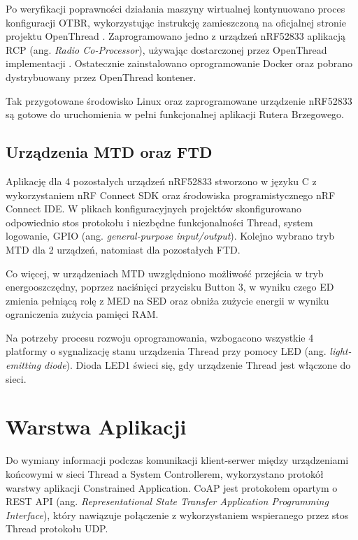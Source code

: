         Po weryfikacji poprawności działania maszyny wirtualnej kontynuowano proces konfiguracji OTBR, wykorzystując instrukcję zamieszczoną na oficjalnej stronie projektu OpenThread \cite{otbr-docker}. Zaprogramowano jedno z urządzeń nRF52833 aplikacją RCP (ang. \textit{Radio Co-Processor}), używając dostarczonej przez OpenThread implementacji \cite{otbr-rcp-app}. Ostatecznie zainstalowano oprogramowanie Docker oraz pobrano dystrybuowany przez OpenThread kontener.

        Tak przygotowane środowisko Linux oraz zaprogramowane urządzenie nRF52833 są gotowe do uruchomienia w pełni funkcjonalnej aplikacji Rutera Brzegowego.

    \subsection{Urządzenia MTD oraz FTD}
    \label{subsubsec:mtd-ftd-devices-implementation}

    Aplikację dla 4 pozostałych urządzeń nRF52833 stworzono w języku C z wykorzystaniem nRF Connect SDK oraz środowiska programistycznego nRF Connect IDE. W plikach konfiguracyjnych projektów skonfigurowano odpowiednio stos protokołu i niezbędne funkcjonalności Thread, system logowanie, GPIO (ang. \textit{general-purpose input/output}). Kolejno wybrano tryb MTD dla 2 urządzeń, natomiast dla pozostałych FTD. 

    Co więcej, w urządzeniach MTD uwzględniono możliwość przejścia w tryb energooszczędny, poprzez naciśnięci przycisku Button 3, w wyniku czego ED zmienia pełniącą rolę z MED na SED oraz obniża zużycie energii w wyniku ograniczenia zużycia pamięci RAM.

    Na potrzeby procesu rozwoju oprogramowania, wzbogacono wszystkie 4 platformy o sygnalizację stanu urządzenia Thread przy pomocy LED (ang. \textit{light-emitting diode}). Dioda LED1 świeci się, gdy urządzenie Thread jest włączone do sieci.
    
\section{Warstwa Aplikacji}

    Do wymiany informacji podczas komunikacji klient-serwer między urządzeniami końcowymi w sieci Thread a System Controllerem, wykorzystano protokół warstwy aplikacji Constrained Application. CoAP jest protokołem opartym o REST API (ang. \textit{Representational State Transfer Application Programming Interface}), który nawiązuje połączenie z wykorzystaniem wspieranego przez stos Thread protokołu UDP.

